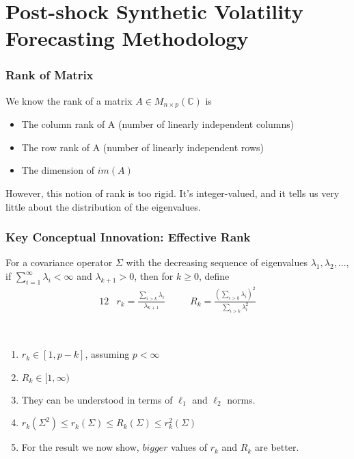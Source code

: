 \documentclass[pdf]{beamer}
\begin{document}
\section{Post-shock Synthetic Volatility Forecasting Methodology}

\begin{frame}
\frametitle{Rank of Matrix}

We know the rank of a matrix $A\in M_{n\times p}(\mathbb{C})$ is 

\begin{itemize}
    \item The column rank of A (number of linearly independent columns)
    \item The row rank of A (number of linearly independent rows)
    \item The dimension of $im(A)$
\end{itemize}

However, this notion of rank is too rigid.  It's integer-valued, and it tells us very little about the distribution of the eigenvalues.
\end{frame}



\begin{frame}
\frametitle{Key Conceptual Innovation: Effective Rank}
    \begin{definition}
    For a covariance operator $\Sigma$ with the decreasing sequence of eigenvalues $\lambda_{1},\lambda_{2},...$, if $\sum_{i=1}^{\infty}\lambda_{i} < \infty$ and $\lambda_{k+1} > 0$, then for $k\geq 0$, define \\

    \begin{alignat*}{12}
    & r_{k} = \frac{ \sum_{i > k}\lambda_{i} }{ \lambda_{k+1} } \quad && R_{k} = \frac{ (\sum_{i > k}\lambda_{i})^{2} }{ \sum_{i>k}\lambda_{i}^{2} } 
    \end{alignat*}
    \end{definition} 


\\
\begin{enumerate}
\item<3-7> $r_{k} \in [1, p - k]$, assuming $p < \infty$
\item<4-7> $R_{k} \in [1, \infty)$
\item<5-7> They can be understood in terms of $\ell_{1}$ and $\ell_{2}$ norms.
\item<6-7> $r_{k}(\Sigma^{2}) \leq r_{k}(\Sigma) \leq R_{k}(\Sigma) \leq r^{2}_{k}(\Sigma) $
\item<7-7> For the result we now show, $\textit{bigger}$ values of $r_{k}$ and $R_{k}$ are better.
\end{enumerate}

\end{frame}
\end{document}
